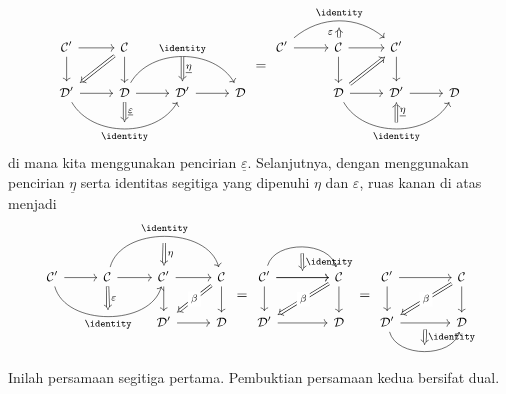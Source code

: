 \begin{bukti}
\[\begin{tikzcd}[every cell/.append style = {font = \small}]
		\mathcal{C}' \arrow[r] \arrow[d] & \mathcal{C} \arrow[d] \arrow[Rightarrow, ld] & & \\
		\mathcal{D}' \arrow[r] \arrow[bend right=60, rr, "\identity"', "" {name=I}] & \mathcal{D} \arrow[r] \arrow[rr, bend left=60, "\identity", "" {name=J}] \arrow[Rightarrow, to=I, "\underline{\varepsilon}"] & \mathcal{D}' \arrow[r] \arrow[Rightarrow, from=J, "\underline{\eta}"] & \mathcal{D}
	\end{tikzcd} = \begin{tikzcd}[every cell/.append style = {font = \small}]
		\mathcal{C}' \arrow[r] \arrow[rr, bend left=40, "\identity", ""' {name=T}] & \mathcal{C} \arrow[r] \arrow[d] \arrow[Rightarrow, to=T, "\varepsilon" inner sep=0.4em] & \mathcal{C}' \arrow[d] & \\
 		& \mathcal{D} \arrow[r] \arrow[rr, bend right=60, "\identity"', "" {name=I}] \arrow[Rightarrow, ru] & \mathcal{D}' \arrow[r] \arrow[Rightarrow, from=I, "\underline{\eta}"'] & \mathcal{D}
	\end{tikzcd}\]
	di mana kita menggunakan pencirian $\underline{\varepsilon}$. Selanjutnya,
	dengan menggunakan pencirian $\underline{\eta}$ serta identitas segitiga
	yang dipenuhi $\eta$ dan $\varepsilon$, ruas kanan di atas menjadi
	\[\begin{tikzcd}[every cell/.append style = {font = \small}]
		\mathcal{C}' \arrow[r] \arrow[rr, bend right=75, "\identity"', "" {name=A}] & \mathcal{C} \arrow[r] \arrow[rr, bend left=75, "\identity", ""' {name=B}] \arrow[Rightarrow, to=A, "\varepsilon"] & \mathcal{C}' \arrow[r] \arrow[d] \arrow[Rightarrow, from=B, "\eta"] & \mathcal{C} \arrow[d] \arrow[Rightarrow, ld, "\beta" description] \\
		& & \mathcal{D}' \arrow[r] & \mathcal{D}
	\end{tikzcd} = \begin{tikzcd}[column sep=large, every cell/.append style = {font = \small}]
		\mathcal{C}' \arrow[r] \arrow[bend left=75, r, ""' {name=T}] \arrow[r, "" {name=B}] \arrow[d] & \mathcal{C} \arrow[d] \arrow[Rightarrow, ld, "\beta" description] \\
		\mathcal{D}' \arrow[r] & \mathcal{D} \arrow[Rightarrow, from=T, to=B, "\identity"]
	\end{tikzcd} = \begin{tikzcd}[column sep=large, every cell/.append style = {font = \small}]
		\mathcal{C}' \arrow[r] \arrow[d] & \mathcal{C} \arrow[d]  \arrow[Rightarrow, ld, "\beta" description] \\
		\mathcal{D}' \arrow[r, ""' {name=T}] \arrow[r, bend right=75, "" {name=B}] & \mathcal{D} \arrow[Rightarrow, from=T, to=B, "\identity"]
	\end{tikzcd}\]
	Inilah persamaan segitiga pertama. Pembuktian persamaan kedua bersifat dual.
\end{bukti}
